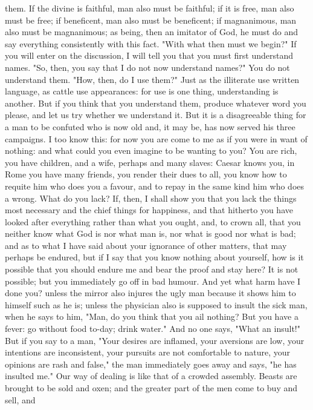 \documentclass[a4paper]{article}
\begin{document}
them. If the divine is faithful, man also must be faithful; if it is free, man
also must be free; if beneficent, man also must be beneficent; if magnanimous,
man also must be magnanimous; as being, then an imitator of God, he must do and
say everything consistently with this fact.
    "With what then must we begin?" If you will enter on the discussion, I will
tell you that you must first understand names. "So, then, you say that I do not
now understand names?" You do not understand them. "How, then, do I use them?"
Just as the illiterate use written language, as cattle use appearances: for use
is one thing, understanding is another. But if you think that you understand
them, produce whatever word you please, and let us try whether we understand
it. But it is a disagreeable thing for a man to be confuted who is now old and,
it may be, has now served his three campaigns. I too know this: for now you are
come to me as if you were in want of nothing: and what could you even imagine
to be wanting to you? You are rich, you have children, and a wife, perhaps and
many slaves: Caesar knows you, in Rome you have many friends, you render their
dues to all, you know how to requite him who does you a favour, and to repay in
the same kind him who does a wrong. What do you lack? If, then, I shall show
you that you lack the things most necessary and the chief things for happiness,
and that hitherto you have looked after everything rather than what you ought,
and, to crown all, that you neither know what God is nor what man is, nor what
is good nor what is bad; and as to what I have said about your ignorance of
other matters, that may perhaps be endured, but if I say that you know nothing
about yourself, how is it possible that you should endure me and bear the proof
and stay here? It is not possible; but you immediately go off in bad humour.
And yet what harm have I done you? unless the mirror also injures the ugly man
because it shows him to himself such as he is; unless the physician also is
supposed to insult the sick man, when he says to him, "Man, do you think that
you ail nothing? But you have a fever: go without food to-day; drink water."
And no one says, "What an insult!" But if you say to a man, "Your desires are
inflamed, your aversions are low, your intentions are inconsistent, your
pursuits are not comfortable to nature, your opinions are rash and false," the
man immediately goes away and says, "he has insulted me."
    Our way of dealing is like that of a crowded assembly. Beasts are brought
to be sold and oxen; and the greater part of the men come to buy and sell, and
\end{document}
